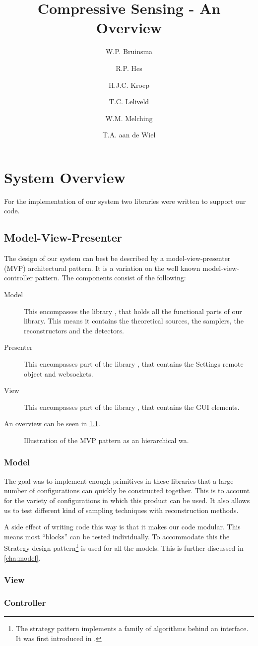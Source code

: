 \documentclass[a4paper, openany, oneside]{memoir}
\title{Compressive Sensing - An Overview}
\author{W.P. Bruinsma \and R.P. Hes \and H.J.C. Kroep \and T.C. Leliveld \and W.M. Melching \and T.A. aan de Wiel}
\begin{document}
\chapter{System Overview}
For the implementation of our system two libraries were written to support our code.

\section{Model-View-Presenter}
\label{sec:model-view-presenter}
The design of our system can best be described by a model-view-presenter (MVP) architectural pattern. It is a variation on the well known model-view-controller pattern. The components consist of the following:
\begin{description}
    \item[Model] This encompasses the library , that holds all the functional parts of our library. This means it contains the theoretical sources, the samplers, the reconstructors and the detectors.
    \item[Presenter] This encompasses part of the library , that contains the Settings remote object and websockets.
    \item[View] This encompasses part of the library , that contains the GUI elements.
\end{description}
An overview can be seen in \cref{fig:MVP}.

\begin{figure}
    \centering
    
    \caption{Illustration of the MVP pattern as an hierarchical wa.}
    \label{fig:MVP}
\end{figure}

\subsection{Model}
\label{sec:model}
The goal was to implement enough primitives in these libraries that a large number of configurations can quickly be constructed together. This is to account for the variety of configurations in which this product can be used. It also allows us to test different kind of sampling techniques with reconstruction methods.

A side effect of writing code this way is that it makes our code modular. This means most ``blocks'' can be tested individually. To accommodate this the Strategy design pattern\footnote{The strategy pattern implements a family of algorithms behind an interface. It was first introduced in \cite{designpatterns}.} is used for all the models. This is further discussed in \cref{cha:model}.

\subsection{View}
\label{sec:view}


\subsection{Controller}
\label{sec:controller}
\end{document}

